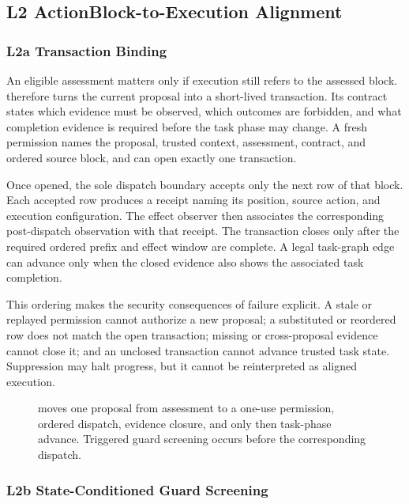 \subsection{L2 ActionBlock-to-Execution Alignment}

\subsubsection{L2a Transaction Binding}

An eligible assessment matters only if execution still refers to the assessed
block.  \transactionbinding therefore turns the current proposal into a
short-lived transaction.  Its contract states which evidence must be observed,
which outcomes are forbidden, and what completion evidence is required before
the task phase may change.  A fresh permission names the proposal, trusted
context, assessment, contract, and ordered source block, and can open exactly
one transaction.

Once opened, the sole dispatch boundary accepts only the next row of that block.
Each accepted row produces a receipt naming its position, source action, and
execution configuration.  The effect observer then associates the corresponding
post-dispatch observation with that receipt.  The transaction closes only after
the required ordered prefix and effect window are complete.  A legal task-graph
edge can advance only when the closed evidence also shows the associated task
completion.

This ordering makes the security consequences of failure explicit.  A stale or
replayed permission cannot authorize a new proposal; a substituted or reordered
row does not match the open transaction; missing or cross-proposal evidence
cannot close it; and an unclosed transaction cannot advance trusted task state.
Suppression may halt progress, but it cannot be reinterpreted as aligned
execution.

\begin{figure}[t]
\centering
\resizebox{.92\columnwidth}{!}{}
\caption{\transactionbinding moves one proposal from assessment to a one-use
permission, ordered dispatch, evidence closure, and only then task-phase
advance.  Triggered guard screening occurs before the corresponding dispatch.}
\label{fig:l2a-transaction}
\end{figure}

\subsubsection{L2b State-Conditioned Guard Screening}

